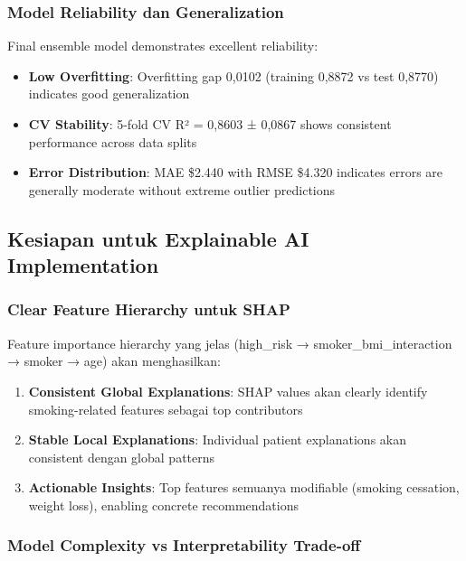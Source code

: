 \subsubsection{Model Reliability dan Generalization}

Final ensemble model demonstrates excellent reliability:

\begin{itemize}
    \item \textbf{Low Overfitting}: Overfitting gap 0,0102 (training 0,8872 vs test 0,8770) indicates good generalization
    \item \textbf{CV Stability}: 5-fold CV R² = 0,8603 ± 0,0867 shows consistent performance across data splits
    \item \textbf{Error Distribution}: MAE \$2.440 with RMSE \$4.320 indicates errors are generally moderate without extreme outlier predictions
\end{itemize}

\subsection{Kesiapan untuk Explainable AI Implementation}
\label{subsec:kesiapan-xai}

\subsubsection{Clear Feature Hierarchy untuk SHAP}

Feature importance hierarchy yang jelas (high\_risk → smoker\_bmi\_interaction → smoker → age) akan menghasilkan:

\begin{enumerate}
    \item \textbf{Consistent Global Explanations}: SHAP values akan clearly identify smoking-related features sebagai top contributors
    \item \textbf{Stable Local Explanations}: Individual patient explanations akan consistent dengan global patterns
    \item \textbf{Actionable Insights}: Top features semuanya modifiable (smoking cessation, weight loss), enabling concrete recommendations
\end{enumerate}

\subsubsection{Model Complexity vs Interpretability Trade-off}

